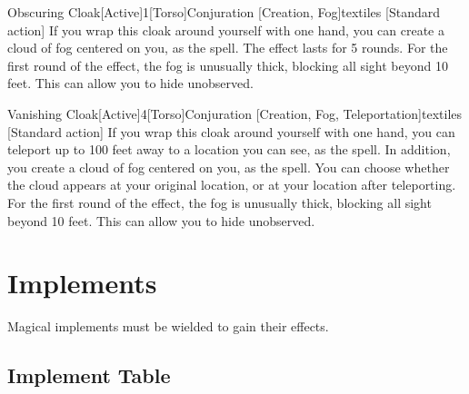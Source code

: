         \begin{magicitemdef}{Obscuring Cloak}[Active]{1}[Torso]{Conjuration [Creation, Fog]}{textiles}
            [Standard action] If you wrap this cloak around yourself with one hand, you can create a cloud of fog centered on you, as the  spell.
            The effect lasts for 5 rounds.
            For the first round of the effect, the fog is unusually thick, blocking all sight beyond 10 feet.
            This can allow you to hide unobserved.
        \end{magicitemdef}

        \begin{magicitemdef}{Vanishing Cloak}[Active]{4}[Torso]{Conjuration [Creation, Fog, Teleportation]}{textiles}
            [Standard action] If you wrap this cloak around yourself with one hand, you can teleport up to 100 feet away to a location you can see, as the  spell.
            In addition, you create a cloud of fog centered on you, as the  spell.
            You can choose whether the cloud appears at your original location, or at your location after teleporting.
            For the first round of the effect, the fog is unusually thick, blocking all sight beyond 10 feet.
            This can allow you to hide unobserved.
        \end{magicitemdef}

\section{Implements}
    Magical implements must be wielded to gain their effects.

    \onecolumn
    \subsection{Implement Table}

